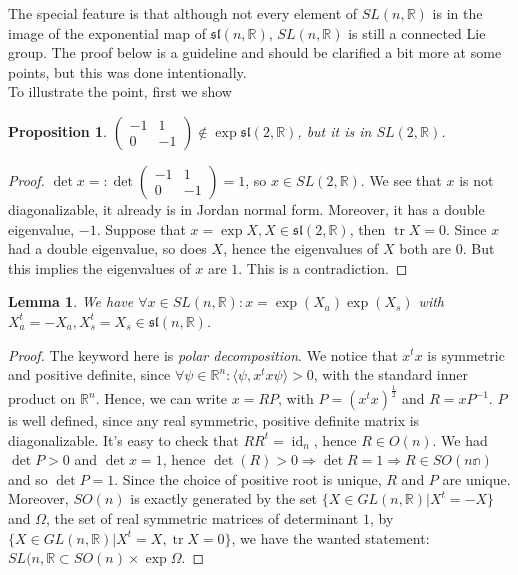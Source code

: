 \documentclass[12pt]{article}
\newtheorem{lem}[thm]{Lemma}
\newtheorem{prop}[thm]{Proposition}
\theoremstyle{definition}
\newcommand{\tr}{\ensuremath{\operatorname{tr}}}
\newcommand{\id}{\ensuremath{\operatorname{id}}}
\begin{document}
The special feature is that although not every element of $SL(n,\mathbb{R})$ is in the image of the exponential map of $\mathfrak{sl}(n,\mathbb{R})$, $SL(n,\mathbb{R})$ is still a connected Lie group. The proof below is a guideline and should be clarified a bit more at some points, but this was done intentionally.\\

To illustrate the point, first we show
\begin{prop} 
$\begin{pmatrix}
	-1 & 1 \\
	0 & -1
\end{pmatrix}
\notin \exp{\mathfrak{sl}(2,\mathbb{R})}$, but it is in $SL(2,\mathbb{R})$.
\end{prop}

\begin{proof}
$\det x =: \det \begin{pmatrix}
	-1 & 1 \\
	0 & -1
\end{pmatrix} = 1$, so $x\in SL(2,\mathbb{R})$. We see that $x$ is not diagonalizable, it already is in Jordan normal form. Moreover, it has a double eigenvalue, $-1$. Suppose that $x=\exp X, X \in \mathfrak{sl}(2,\mathbb{R})$, then $\tr{X}=0$. Since $x$ had a double eigenvalue, so does $X$, hence the eigenvalues of $X$ both are $0$. But this implies the eigenvalues of $x$ are $1$. This is a contradiction.
\end{proof}

\begin{lem}
We have $\forall x\in SL(n,\mathbb{R}): x = \exp(X_a)\exp(X_s)$ with $X_a^t=-X_a, X_s^t=X_s\in \mathfrak{sl}(n,\mathbb{R})$.
\end{lem}

\begin{proof}
The keyword here is \textit{polar decomposition}.
We notice that $x^tx$ is symmetric and positive definite, since $\forall \psi\in\mathbb{R}^n: \langle \psi,x^tx\psi\rangle >0$, with the standard inner product on $\mathbb{R}^n$. Hence, we can write $x=RP$, with $P=(x^tx)^\frac{1}{2}$ and $R=xP^{-1}$. $P$ is well defined, since any real symmetric, positive definite matrix is diagonalizable. It's easy to check that $RR^t=\id_n$, hence $R\in O(n)$. We had $\det{P}>0$ and $\det{x}=1$, hence $\det(R)>0 \Rightarrow \det{R}=1 \Rightarrow R\in SO(n\mathbb{n})$ and so $\det{P}=1$. Since the choice of positive root is unique, $R$ and $P$ are unique. Moreover, $SO(n)$ is exactly generated by the set $\{ X\in GL(n,\mathbb{R}) | X^t=-X \}$ and $\Omega$, the set of real symmetric matrices of determinant $1$, by $\{ X\in GL(n,\mathbb{R}) | X^t=X, \tr{X}=0 \}$, we have the wanted statement: $SL(n,\mathbb{R} \subset SO(n)\times \exp{\Omega}$.
\end{proof}
\end{document}
